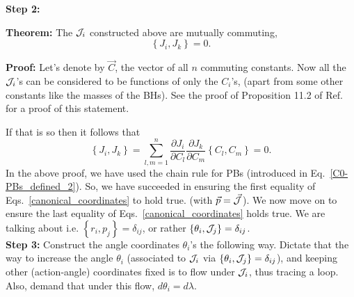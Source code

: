 \hfill \break

\newpage


\textbf{Step 2:} 

\textbf{Theorem:} The $\mathcal{J}_i$ constructed above are mutually commuting, 
\begin{equation}
\left\{J_{i}, J_{k}\right\}  =  0.          \label{actions_commute}
\end{equation}


\textbf{Proof:}  
Let's denote by $\vec{C}$, the vector of all $n$ commuting constants.
Now all the $\mathcal{J}_i$'s can be considered to be functions of only the $C_i$'s,
(apart from some other constants like the masses of the BHs).
See the proof of Proposition 11.2 of Ref.~\cite{fasano} for a proof
of this statement.

If that is so then it follows that
\begin{equation}
\left\{J_{i}, J_{k}\right\}=\sum_{l, m=1}^{n} \frac{\partial J_{i}}{\partial C_{l}} \frac{\partial J_{k}}{\partial C_{m}}\left\{C_{l}, C_{m}\right\}=0 . 
\end{equation}
In the above proof, we have used the chain rule for PBs (introduced in
Eq.~\eqref{C0-PBs_defined_2}). So, we have succeeded in ensuring the first equality of Eqs.~\eqref{canonical_coordinates}
to hold true. (with $\vec{p} = \vec{\mathcal{J}}$). We now move on to ensure the last equality of 
Eqs.~\eqref{canonical_coordinates} holds true. We are talking about i.e. $\left\{r_{i}, p_{j}\right\}=\delta_{ij} $,
or rather $\left\{\theta_{i}, \mathcal{J}_{j}\right\} = \delta_{ij}$.   \\




\textbf{Step 3:} Construct the angle coordinates $\theta_i$'s the following way.
Dictate that the way to increase the angle $\theta_i$ (associated to $\mathcal{J}_i$
via $\left\lbrace \theta_i, \mathcal{J}_j \right\rbrace = \delta_{ij}$),
and keeping other (action-angle) coordinates fixed
is to flow under $\mathcal{J}_i$, thus tracing a loop.
Also, demand that under this flow, $d \theta_i = d \lambda$.



